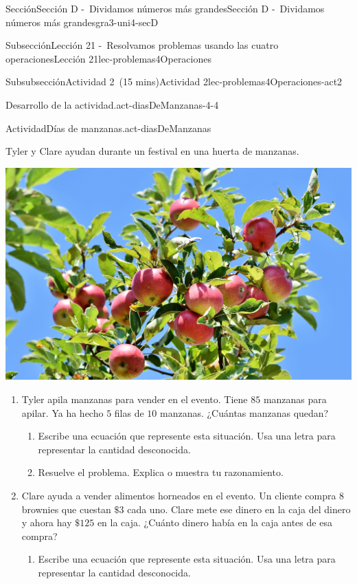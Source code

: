 \documentclass[oneside,10pt,]{article}
\begin{document}
\begin{sectionptx}{Sección}{Sección D -~Dividamos números más grandes}{}{Sección D -~Dividamos números más grandes}{}{}{gra3-uni4-secD}
\begin{subsectionptx}{Subsección}{Lección 21 -~Resolvamos problemas usando las cuatro operaciones}{}{Lección 21}{}{}{lec-problemas4Operaciones}
\begin{subsubsectionptx}{Subsubsección}{Actividad 2~(15 mins)}{}{Actividad 2}{}{}{lec-problemas4Operaciones-act2}
\begin{paragraphs}{Desarrollo de la actividad.}{act-diasDeManzanas-4-4}
\begin{itemize}[label=\textbullet]
\begin{itemize}[label=$\circ$]
\end{itemize}
\end{itemize}
\end{paragraphs}%
\begin{activity}{Actividad}{Días de manzanas.}{act-diasDeManzanas}%
\begin{sidebyside}{2}{0}{0.05}{0.05}%
\begin{sbspanel}{0.6}%
Tyler y Clare ayudan durante un festival en una huerta de manzanas.%
\end{sbspanel}%
\begin{sbspanel}{0.3}%
\includegraphics[width=\linewidth]{external/jpg-source/apple-3535566_1920.jpg}
\end{sbspanel}%
\end{sidebyside}%
%
\begin{enumerate}
\item{}Tyler apila manzanas para vender en el evento. Tiene \(85\) manzanas para apilar. Ya ha hecho \(5\) filas de \(10\) manzanas. ¿Cuántas manzanas quedan?%
%
\begin{enumerate}
\item{}Escribe una ecuación que represente esta situación. Usa una letra para representar la cantidad desconocida.%
\item{}Resuelve el problema. Explica o muestra tu razonamiento.%
\end{enumerate}
\item{}Clare ayuda a vender alimentos horneados en el evento. Un cliente compra \(8\) brownies que cuestan \(\$3\) cada uno. Clare mete ese dinero en la caja del dinero y ahora hay \(\$125\) en la caja. ¿Cuánto dinero había en la caja antes de esa compra?%
%
\begin{enumerate}
\item{}Escribe una ecuación que represente esta situación. Usa una letra para representar la cantidad desconocida.%

\end{enumerate}
\end{enumerate}
\end{activity}
\end{subsubsectionptx}
\end{subsectionptx}
\end{sectionptx}
\end{document}
